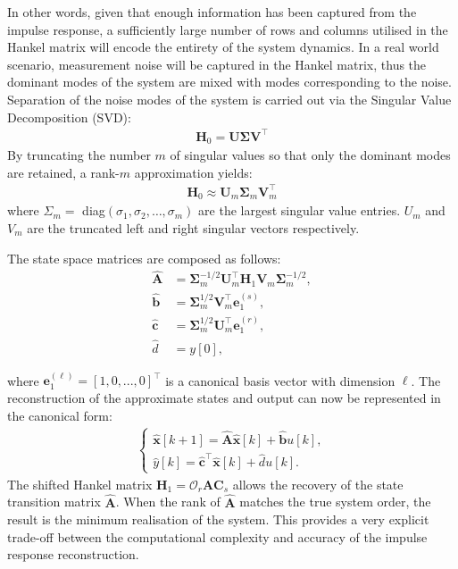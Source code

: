 In other words, given that enough information has been captured from the impulse response, a sufficiently large number of rows and columns utilised in the Hankel matrix will encode the entirety of the system dynamics. In a real world scenario, measurement noise will be captured in the Hankel matrix, thus the dominant modes of the system are mixed with modes corresponding to the noise. Separation of the noise modes of the system is carried out via the Singular Value Decomposition (SVD):
\begin{align}
\label{eq:svd}
    \mathbf{H}_0 = \mathbf{U \Sigma V}^\top
\end{align}
By truncating the number $m$ of singular values so that only the dominant modes are retained, a rank-$m$ approximation yields:
\begin{align}
\label{eq:svdm}
    \mathbf{H}_0 \approx \mathbf{U}_m \mathbf{\Sigma}_m \mathbf{V}_{m}^{\top}
\end{align}
where $\Sigma_m =$ diag$(\sigma_1,\sigma_2, \dots, \sigma_m)$ are the largest singular value entries. $U_m$ and $V_m$ are the truncated left and right singular vectors respectively.

The state space matrices are composed as follows:
\begin{subequations}
\begin{align}
\label{eq:ss}
\hat{\mathbf{A}} &= \mathbf{\Sigma}_{m}^{-1/2} \mathbf{U}^{\top}_m \mathbf{H}_1 \mathbf{V}_m \mathbf{\Sigma}_{m}^{-1/2}, \\
\hat{\mathbf{b}} &= \mathbf{\Sigma}_{m}^{1/2} \mathbf{V}_m^{\top} \mathbf{e}_{1}^{(s)}, \\
\hat{\mathbf{c}} &= \mathbf{\Sigma}_{m}^{1/2} \mathbf{U}_{m}^{\top} \mathbf{e}_{1}^{(r)}, \\
\hat{d} &= y[0],
\end{align}
\end{subequations}

where $\mathbf{e}_{1}^{(\ell)} = [1, 0, ..., 0]^{\top}$ is a canonical basis vector with dimension $\ell$. The reconstruction of the approximate states and output can now be represented in the canonical form:
\begin{align}
\label{eq:output}
\begin{cases}
    \hat{\mathbf{x}}[k+1] = \hat{\mathbf{A}} \hat{\mathbf{x}} [k] + \hat{\mathbf{b}} u[k], \\
    \hat{y} [k] = \hat{\mathbf{c}}^{\top} \hat{\mathbf{x}} [k] + \hat{d} u[k].
\end{cases}
\end{align}
The shifted Hankel matrix $\mathbf{H}_1 = \mathcal{O}_r \mathbf{A} \mathbf{C}_s$ allows the recovery of the state transition matrix $\hat{\mathbf{A}}$. When the rank of $\hat{\mathbf{A}}$ matches the true system order, the result is the minimum realisation of the system. This provides a very explicit trade-off between the computational complexity and accuracy of the impulse response reconstruction.

